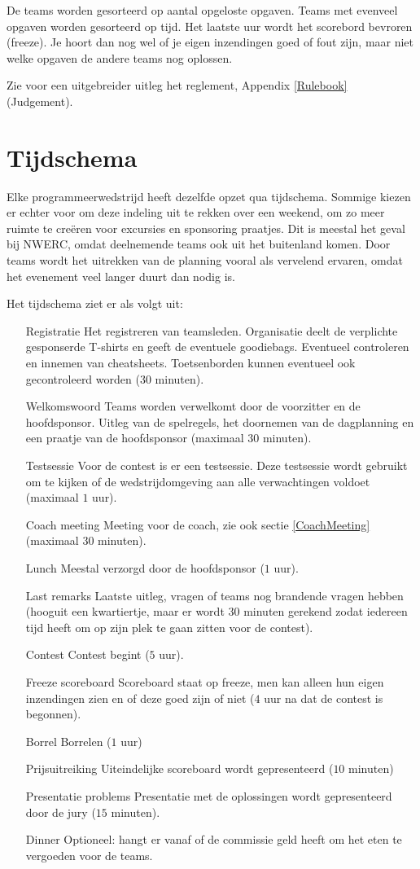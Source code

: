 De teams worden gesorteerd op aantal opgeloste opgaven. Teams met evenveel opgaven worden gesorteerd op tijd. Het laatste uur wordt het scorebord bevroren (freeze). Je hoort dan nog wel of je eigen inzendingen goed of fout zijn, maar niet welke opgaven de andere teams nog oplossen.

Zie voor een uitgebreider uitleg het reglement, Appendix \ref{Rulebook} (Judgement).

\section{Tijdschema}
Elke programmeerwedstrijd heeft dezelfde opzet qua tijdschema. Sommige kiezen er echter voor om deze indeling uit te rekken over een weekend, om zo meer ruimte te cre\"eren voor excursies en sponsoring praatjes. Dit is meestal het geval bij NWERC, omdat deelnemende teams ook uit het buitenland komen. Door teams wordt het uitrekken van de planning vooral als vervelend ervaren, omdat het evenement veel langer duurt dan nodig is.

Het tijdschema ziet er als volgt uit:
\begin{itemize}
\item[Registratie] Het registreren van teamsleden. Organisatie deelt de verplichte gesponserde T-shirts en geeft de eventuele goodiebags. Eventueel controleren en innemen van cheatsheets. Toetsenborden kunnen eventueel ook gecontroleerd worden ($30$ minuten).
\item[Welkomswoord] Teams worden verwelkomt door de voorzitter en de hoofdsponsor. Uitleg van de spelregels, het doornemen van de dagplanning en een praatje van de hoofdsponsor (maximaal $30$ minuten).
\item[Testsessie] Voor de contest is er een testsessie. Deze testsessie wordt gebruikt om te kijken of de wedstrijdomgeving aan alle verwachtingen voldoet (maximaal $1$ uur).
\item[Coach meeting] Meeting voor de coach, zie ook sectie \ref{CoachMeeting} (maximaal $30$ minuten).
\item[Lunch] Meestal verzorgd door de hoofdsponsor ($1$ uur).
\item[Last remarks] Laatste uitleg, vragen of teams nog brandende vragen hebben (hooguit een kwartiertje, maar er wordt $30$ minuten gerekend zodat iedereen tijd heeft om op zijn plek te gaan zitten voor de contest).
\item[Contest] Contest begint ($5$ uur).
\item[Freeze scoreboard] Scoreboard staat op freeze, men kan alleen hun eigen inzendingen zien en of deze goed zijn of niet ($4$ uur na dat de contest is begonnen).
\item[Borrel] Borrelen ($1$ uur)
\item[Prijsuitreiking] Uiteindelijke scoreboard wordt gepresenteerd ($10$ minuten)
\item[Presentatie problems] Presentatie met de oplossingen wordt gepresenteerd door de jury ($15$ minuten).
\item[Dinner] Optioneel: hangt er vanaf of de commissie geld heeft om het eten te vergoeden voor de teams.
\end{itemize}